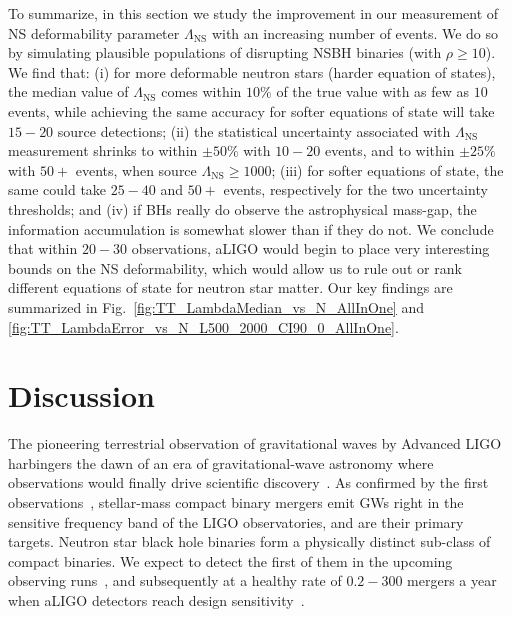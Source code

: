 \documentclass[aps,prd,amsmath,floats,floatfix, twocolumn,
superscriptaddress,nofootinbib,showpacs]{revtex4-1}
\newcommand{\lambdans}{\Lambda_\mathrm{NS}}
\begin{document}
To summarize, in this section we study the improvement in our measurement of 
NS deformability parameter $\lambdans$ with an increasing number of events. We
do so by simulating plausible populations of disrupting NSBH binaries (with
$\rho\geq 10$). We find that:
(i) for more deformable neutron stars (harder equation of states), the median
value of $\lambdans$ comes within $10\%$ of the true value with as 
few as $10$ events, while achieving the same accuracy for softer equations of 
state will take $15-20$ source detections; (ii) the statistical uncertainty
associated with $\lambdans$ measurement shrinks to within $\pm50\%$ with
$10-20$ events, and to within $\pm 25\%$ with $50+$ events, when source 
$\lambdans\geq 1000$; (iii) for softer equations of state, the same could take
$25-40$ and $50+$ events, respectively for the two uncertainty thresholds;
and (iv) if BHs really do observe the astrophysical mass-gap, the information
accumulation is somewhat slower than if they do not. We conclude that within
$20-30$ observations, aLIGO would begin to place very interesting bounds on 
the NS deformability, which would allow us to rule out or rank different
equations of state for neutron star matter. Our key findings are 
summarized in Fig.~\ref{fig:TT_LambdaMedian_vs_N_AllInOne} and
\ref{fig:TT_LambdaError_vs_N_L500_2000_CI90_0_AllInOne}.





\section{Discussion}\label{s1:discussion}

The pioneering terrestrial observation of gravitational waves by Advanced LIGO
harbingers the dawn of an era of gravitational-wave astronomy where observations
would finally drive scientific discovery~\cite{Abbott:2016blz}. As confirmed by
the first observations~\cite{Abbott:2016blz,Abbott:2016nmj,Abbott:2016nhf},
stellar-mass compact binary mergers emit GWs right in the sensitive frequency
band of the LIGO observatories, and are their primary targets.
Neutron star black hole binaries form a physically distinct sub-class of
compact binaries. We expect to detect the first of them in the upcoming
observing runs~\cite{Abbott:2016ymx}, and subsequently at a healthy rate of
$0.2-300$ mergers a year when aLIGO detectors reach design
sensitivity~\cite{Abadie:2010cf}.
\end{document}
